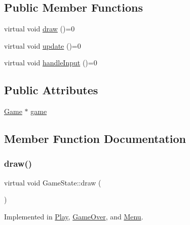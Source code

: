 \subsection*{Public Member Functions}
\begin{DoxyCompactItemize}
\item 
virtual void \hyperlink{class_game_state_ac872d748df12ac36d7a42a191997e4f7}{draw} ()=0
\item 
virtual void \hyperlink{class_game_state_ab2864bfa04f92f6966861a1f2883bda0}{update} ()=0
\item 
virtual void \hyperlink{class_game_state_a970b55edd5a1da31ea0f7113e2c1f85a}{handle\+Input} ()=0
\end{DoxyCompactItemize}
\subsection*{Public Attributes}
\begin{DoxyCompactItemize}
\item 
\hyperlink{class_game}{Game} $\ast$ \hyperlink{class_game_state_a355a79415b9ef63c2aec1448a99f6e71}{game}
\end{DoxyCompactItemize}


\subsection{Member Function Documentation}
\mbox{\label{class_game_state_ac872d748df12ac36d7a42a191997e4f7}} 
\subsubsection{\texorpdfstring{draw()}{draw()}}
{\footnotesize\ttfamily virtual void Game\+State\+::draw (\begin{DoxyParamCaption}{ }\end{DoxyParamCaption})\hspace{0.3cm}{\ttfamily [pure virtual]}}



Implemented in \hyperlink{class_play_a026d1354c1b7ac0df50b7108c78aec61}{Play}, \hyperlink{class_game_over_a250dc52de3aed814575b8f2df3ecbb06}{Game\+Over}, and \hyperlink{class_menu_a2cd7ab9901a8f42a3ae977d0774398a6}{Menu}.

